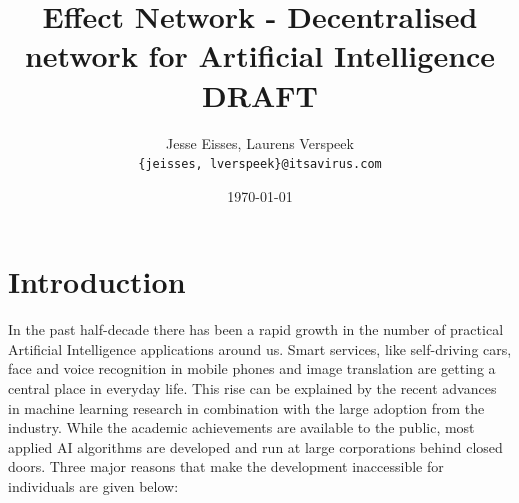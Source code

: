 \documentclass{article}
\title{Effect Network - Decentralised network for Artificial Intelligence \\ \vspace{16pt} \large \textbf{DRAFT}}
\date{\today}
\author{Jesse Eisses, Laurens Verspeek \\
  \small \texttt{\{jeisses, lverspeek\}@itsavirus.com}}
\begin{document}
\maketitle

\begin{abstract}

\end{abstract}

\section{Introduction}
In the past half-decade there has been a rapid growth in the number of
practical Artificial Intelligence applications around us. Smart
services, like self-driving cars, face and voice recognition in mobile
phones and image translation are getting a central place in everyday
life. This rise can be explained by the recent advances in machine
learning research in combination with the large adoption from the
industry. While the academic achievements are available to the public,
most applied AI algorithms are developed and run at large corporations
behind closed doors. Three major reasons that make the development
inaccessible for individuals are given below:
\end{document}
